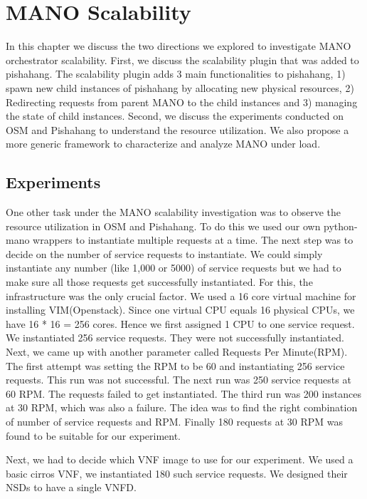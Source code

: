 \chapter{MANO Scalability}
\label{ch:Scalability}

In this chapter we discuss the two directions we explored to investigate MANO orchestrator scalability. First, we discuss the scalability plugin that was added to pishahang. The scalability plugin adds 3 main functionalities to pishahang, 1) spawn new child instances of pishahang by allocating new physical resources, 2) Redirecting requests from parent MANO to the child instances and 3) managing the state of child instances. Second, we discuss the experiments conducted on OSM and Pishahang to understand the resource utilization. We also propose a more generic framework to characterize and analyze MANO under load.





\section{Experiments}
One other task under the MANO scalability investigation was to observe the resource utilization in OSM and Pishahang. To do this we used our own python-mano wrappers to instantiate multiple requests at a time. The next step was to decide on the number of service requests to instantiate. We could simply instantiate any number (like 1,000 or 5000) of service requests but we had to make sure all those requests get successfully instantiated. For this, the infrastructure was the only crucial factor. We used a 16 core virtual machine for installing VIM(Openstack). Since one virtual CPU equals 16 physical CPUs, we have 16 * 16 = 256 cores. Hence we first assigned 1 CPU to one service request. We instantiated 256 service requests. They were not successfully instantiated. Next, we came up with another parameter called Requests Per Minute(RPM). The first attempt was setting the RPM to be 60 and instantiating 256 service requests. This run was not successful. The next run was 250 service requests at 60 RPM. The requests failed to get instantiated. The third run was 200 instances at 30 RPM, which was also a failure. The idea was to find the right combination of number of service requests and RPM. Finally 180 requests at 30 RPM was found to be suitable for our experiment. 

Next, we had to decide which VNF image to use for our experiment. We used a basic cirros VNF, we instantiated 180 such service requests. We designed their NSDs to have a single VNFD. 


